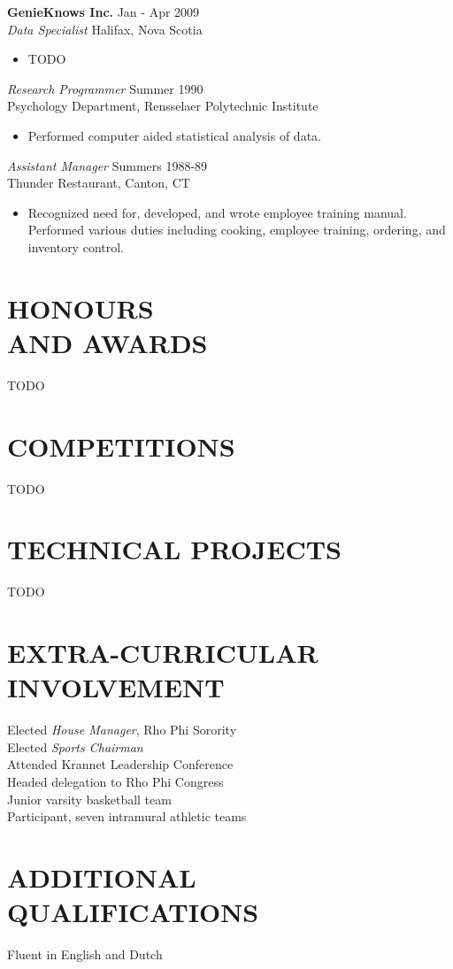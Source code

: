 \documentclass[margin]{res}
\begin{document}
\begin{resume}
	\textbf{GenieKnows Inc.} \hfill Jan - Apr 2009 \\
    {\sl Data Specialist} \hfill Halifax, Nova Scotia
	\begin{itemize}  \itemsep -2pt %
	  \item TODO
	\end{itemize}
	
	{\sl Research Programmer} \hfill Summer 1990 \\
    Psychology Department, Rensselaer Polytechnic Institute 
	\begin{itemize}  \itemsep -2pt %
    \item Performed computer aided statistical analysis of data. 
    \end{itemize} 
        
	{\sl Assistant Manager} \hfill Summers 1988-89 \\
    Thunder Restaurant, Canton, CT
	\begin{itemize}
    \item Recognized need for, developed, and wrote employee training manual.
    Performed various duties including cooking, employee training, ordering, and inventory control.
	\end{itemize} 

\section{HONOURS \\ AND AWARDS}
  TODO
 
\section{COMPETITIONS}
  TODO

\section{TECHNICAL PROJECTS}
  TODO

\section{EXTRA-CURRICULAR \\ INVOLVEMENT}
            Elected {\it House Manager}, Rho Phi Sorority \\
            Elected {\it Sports Chairman} \\
            Attended Krannet Leadership Conference \\
                Headed delegation to Rho Phi Congress \\
                Junior varsity basketball team \\
                Participant, seven intramural athletic teams 
 
\section{ADDITIONAL \\QUALIFICATIONS}
			Fluent in English and Dutch

\end{resume}
\end{document}
